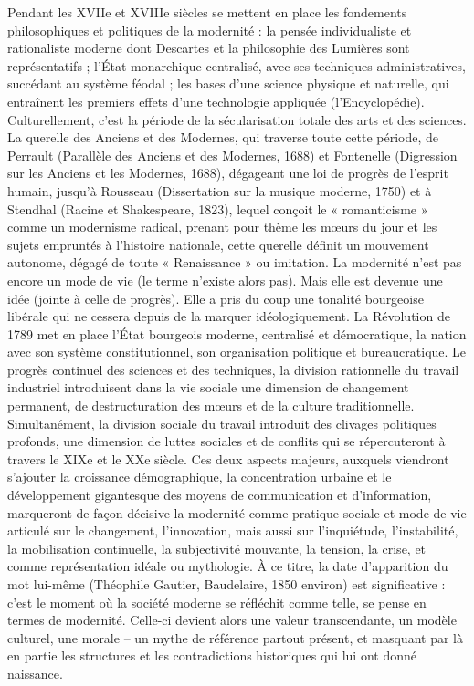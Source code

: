Pendant les XVIIe et XVIIIe siècles se mettent en place les fondements philosophiques et politiques de la modernité : la pensée individualiste et rationaliste moderne dont Descartes et la philosophie des Lumières sont représentatifs ; l'État monarchique centralisé, avec ses techniques administratives, succédant au système féodal ; les bases d'une science physique et naturelle, qui entraînent les premiers effets d'une technologie appliquée (l'Encyclopédie).
Culturellement, c'est la période de la sécularisation totale des arts et des sciences. La querelle des Anciens et des Modernes, qui traverse toute cette période, de Perrault (Parallèle des Anciens et des Modernes, 1688) et Fontenelle (Digression sur les Anciens et les Modernes, 1688), dégageant une loi de progrès de l'esprit humain, jusqu'à Rousseau (Dissertation sur la musique
moderne, 1750) et à Stendhal (Racine et Shakespeare, 1823), lequel conçoit le « romanticisme » comme un modernisme radical, prenant pour thème les mœurs du jour et les sujets empruntés à l'histoire nationale, cette querelle définit un mouvement autonome, dégagé de toute « Renaissance » ou imitation. La modernité n'est pas encore un mode de vie (le terme n'existe alors pas). Mais elle est devenue une idée (jointe à celle de progrès). Elle a pris du coup une tonalité bourgeoise libérale qui ne cessera depuis de la marquer idéologiquement.
La Révolution de 1789 met en place l'État bourgeois moderne, centralisé et démocratique, la nation avec son système constitutionnel, son organisation politique et bureaucratique.
Le progrès continuel des sciences et des techniques, la division rationnelle du travail industriel introduisent dans la vie sociale une dimension de changement permanent, de destructuration des mœurs et de la culture traditionnelle. Simultanément, la division sociale du travail introduit des clivages politiques profonds, une dimension de luttes sociales et de conflits qui se répercuteront à travers le XIXe et le XXe siècle.
Ces deux aspects majeurs, auxquels viendront s'ajouter la croissance démographique, la concentration urbaine et le développement gigantesque des moyens de communication et d'information, marqueront de façon décisive la modernité comme pratique sociale et mode de vie articulé sur le changement, l'innovation, mais aussi sur l'inquiétude, l'instabilité, la mobilisation continuelle, la subjectivité mouvante, la tension, la crise, et comme représentation idéale ou mythologie. À ce titre, la date d'apparition du mot lui-même (Théophile Gautier, Baudelaire, 1850 environ) est significative : c'est le moment où la société moderne se réfléchit comme telle, se pense en termes de modernité. Celle-ci devient alors une valeur transcendante, un modèle culturel, une morale – un mythe de référence partout présent, et masquant par là en partie les structures et les contradictions historiques qui lui ont donné naissance.


